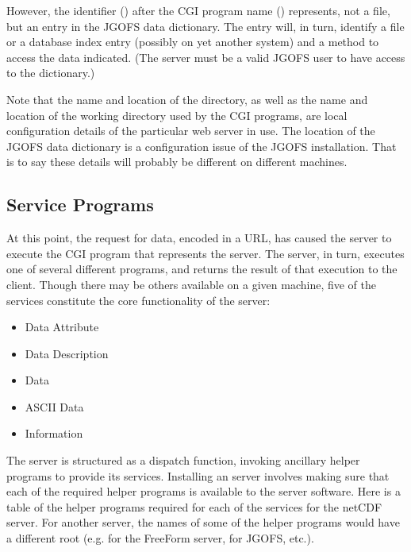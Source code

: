  
However, the identifier () after the CGI program name
() represents, not a file, but an entry in the JGOFS data
dictionary. The entry will, in turn, identify a file or a database
index entry (possibly on yet another system) and a method to access
the data indicated. (The  server must be a valid JGOFS user to
have access to the dictionary.)

Note that the name and location of the  directory, as
well as the name and location of the working directory used by the CGI
programs, are local configuration details of the particular web server
in use. The location of the JGOFS data dictionary is a configuration
issue of the JGOFS installation. That is to say these details will
probably be different on different machines.

\subsection{Service Programs}
\label{opd-server,service}

At this point, the request for data, encoded in a URL, has caused the
 server to execute the CGI program that represents the \opendap
server. The \opendap server, in turn, executes one of several different
 programs, and returns the result of that execution to
the client.  Though there may be others available on a given machine,
five of the services constitute the core functionality of the \opendap
server:

\begin{itemize}
\item Data Attribute
\item Data Description
\item Data
\item ASCII Data
\item Information
\end{itemize}


The \opendap server is structured as a dispatch function, invoking
ancillary helper programs to provide its services.  Installing an \opendap
server involves making sure that each of the required helper programs
is available to the server software.  Here is a table of the helper
programs required for each of the \opendap services for the netCDF 
server.  For another \opendap server, the names of some of the helper
programs would have a different root (e.g.  for the FreeForm
server,  for JGOFS, etc.).

